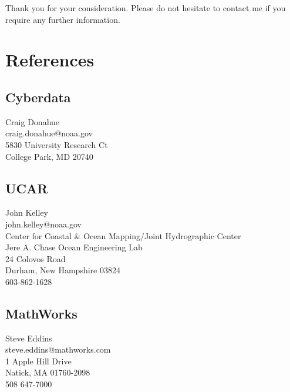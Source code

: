 \documentclass[11pt]{moderncv}  %
\begin{document}
Thank you for your consideration.  Please do not hesitate to contact
me if you require any further information.

\makeletterclosing

\clearpage

\section{References}

\subsection{Cyberdata}
Craig Donahue\\
craig.donahue@noaa.gov\\
5830 University Research Ct\\
College Park, MD 20740

\subsection{UCAR}
John Kelley\\
john.kelley@noaa.gov\\
Center for Coastal \& Ocean Mapping/Joint Hydrographic Center\\
Jere A. Chase Ocean Engineering Lab\\
24 Colovos Road\\
Durham, New Hampshire 03824\\
603-862-1628\\


\subsection{MathWorks}
Steve Eddins\\
steve.eddins@mathworks.com\\
1 Apple Hill Drive\\
Natick, MA 01760-2098\\
508 647-7000
\end{document}
